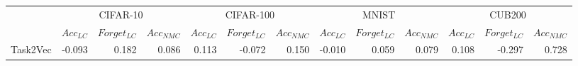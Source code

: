 \begin{table}[h]
\centering
\begin{tabular}{lrrrrrrrrrrrr}
\toprule
{} & \multicolumn{3}{c}{CIFAR-10} & \multicolumn{3}{c}{CIFAR-100} & \multicolumn{3}{c}{MNIST} & \multicolumn{3}{c}{CUB200} \\
{} & $Acc_{LC}$ & $Forget_{LC}$ & $Acc_{NMC}$ & $Acc_{LC}$ & $Forget_{LC}$ & $Acc_{NMC}$ & $Acc_{LC}$ & $Forget_{LC}$ & $Acc_{NMC}$ & $Acc_{LC}$ & $Forget_{LC}$ & $Acc_{NMC}$ \\
\midrule
Task2Vec &     -0.093 &         0.182 &       0.086 &      0.113 &        -0.072 &       0.150 &     -0.010 &         0.059 &       0.079 &      0.108 &        -0.297 &       0.728 \\
\bottomrule
\end{tabular}
\end{table}
